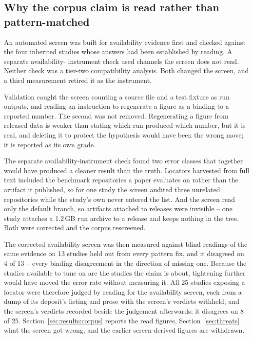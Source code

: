 \subsection{Why the corpus claim is read rather than pattern-matched}
\label{sec:method:verification}

An automated screen was built for availability evidence first and checked against the four
inherited studies whose answers had been established by reading. A separate availability-
instrument check used channels the screen does not read. Neither check was a tier-two
compatibility analysis. Both changed the screen, and a third measurement retired it as the
instrument.

Validation caught the screen counting a source file and a test fixture as run outputs, and
reading an instruction to regenerate a figure as a binding to a reported number. The second
was not removed. Regenerating a figure from released data is weaker than stating which run
produced which number, but it is real, and deleting it to protect the hypothesis would have
been the wrong move; it is reported as its own grade.

The separate availability-instrument check found two error classes that together would have produced a
cleaner result than the truth. Locators harvested from full text included the benchmark
repositories a paper evaluates on rather than the artifact it published, so for one study
the screen audited three unrelated repositories while the study's own never entered the
list. And the screen read only the default branch, so artifacts attached to releases were
invisible -- one study attaches a 1.2\,GB run archive to a release and keeps nothing in the
tree. Both were corrected and the corpus rescreened.

The corrected availability screen was then measured against blind readings of the same evidence on 13
studies held out from every pattern fix, and it disagreed on 4 of 13 -- every binding disagreement in
the direction of missing one. Because the studies available to tune on are the studies the
claim is about, tightening further would have moved the error rate without measuring it. All
25 studies exposing a locator were therefore judged by reading for the availability screen,
each from a dump of its deposit's listing and prose with the screen's verdicts withheld, and the screen's verdicts
recorded beside the judgement afterwards; it disagrees on 8 of 25.
Section~\ref{sec:results:corpus} reports the read figures,
Section~\ref{sec:threats} what the screen got wrong, and the earlier screen-derived figures
are withdrawn.
